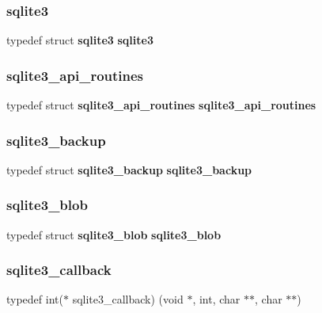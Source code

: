 \subsubsection{sqlite3}
{\footnotesize\ttfamily typedef struct \textbf{ sqlite3} \textbf{ sqlite3}}

\mbox{\label{sqlite3_8h_a869dacab3a9cd10309755246e39e132c}} 
\subsubsection{sqlite3\_api\_routines}
{\footnotesize\ttfamily typedef struct \textbf{ sqlite3\+\_\+api\+\_\+routines} \textbf{ sqlite3\+\_\+api\+\_\+routines}}

\mbox{\label{sqlite3_8h_a758dbaa6678a107d36a2646342623635}} 
\subsubsection{sqlite3\_backup}
{\footnotesize\ttfamily typedef struct \textbf{ sqlite3\+\_\+backup} \textbf{ sqlite3\+\_\+backup}}

\mbox{\label{sqlite3_8h_a3eb4857c157c542bb3fb7d8cbf38a662}} 
\subsubsection{sqlite3\_blob}
{\footnotesize\ttfamily typedef struct \textbf{ sqlite3\+\_\+blob} \textbf{ sqlite3\+\_\+blob}}

\mbox{\label{sqlite3_8h_aede337a366367e94a52d849482967ddd}} 
\subsubsection{sqlite3\_callback}
{\footnotesize\ttfamily typedef int($\ast$ sqlite3\+\_\+callback) (void $\ast$, int, char $\ast$$\ast$, char $\ast$$\ast$)}

\mbox{\label{sqlite3_8h_a3b519553ffec8fc42b2356f5b1ebdc57}} 
